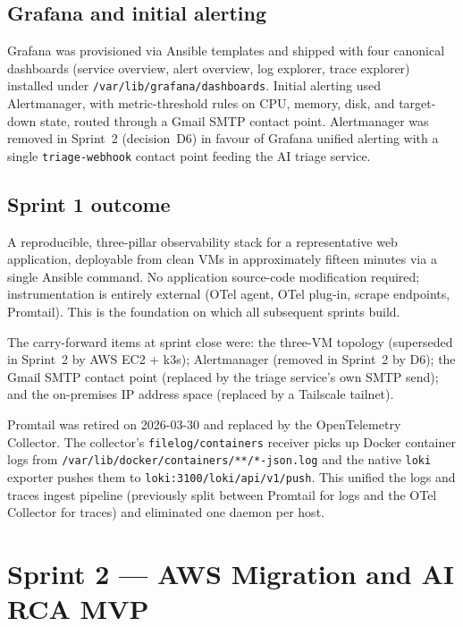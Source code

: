 \documentclass[11pt,a4paper,oneside]{report}
\begin{document}
\section{Grafana and initial alerting}

Grafana was provisioned via Ansible templates and shipped with four
canonical dashboards (service overview, alert overview, log explorer,
trace explorer) installed under \texttt{/var/lib/grafana/dashboards}.
Initial alerting used Alertmanager, with metric-threshold rules on
CPU, memory, disk, and target-down state, routed through a Gmail SMTP
contact point.  Alertmanager was removed in Sprint~2 (decision~D6) in
favour of Grafana unified alerting with a single \texttt{triage-webhook}
contact point feeding the AI triage service.

\section{Sprint 1 outcome}

\begin{winbox}[title={Sprint 1 deliverables}]
A reproducible, three-pillar observability stack for a representative
web application, deployable from clean VMs in approximately fifteen
minutes via a single Ansible command.  No application source-code
modification required; instrumentation is entirely external (OTel
agent, OTel plug-in, scrape endpoints, Promtail).  This is the
foundation on which all subsequent sprints build.
\end{winbox}

The carry-forward items at sprint close were: the three-VM topology
(superseded in Sprint~2 by AWS EC2 + k3s); Alertmanager (removed in
Sprint~2 by D6); the Gmail SMTP contact point (replaced by the triage
service's own SMTP send); and the on-premises IP address space
(replaced by a Tailscale tailnet).

Promtail was retired on 2026-03-30 and replaced by the OpenTelemetry
Collector.  The collector's \texttt{filelog/containers} receiver picks
up Docker container logs from
\texttt{/var/lib/docker/containers/**/*-json.log} and the native
\texttt{loki} exporter pushes them to
\texttt{loki:3100/loki/api/v1/push}.  This unified the logs and
traces ingest pipeline (previously split between Promtail for logs
and the OTel Collector for traces) and eliminated one daemon per host.

\chapter{Sprint 2 --- AWS Migration and AI RCA MVP}
\label{ch:sprint2}
\end{document}
